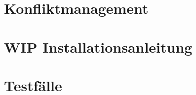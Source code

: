 \section{\label{chap:konfliktmanagement}Konfliktmanagement}

%
%
\section{WIP Installationsanleitung}


%
%
\section{\label{chap:impl:test}Testfälle}
